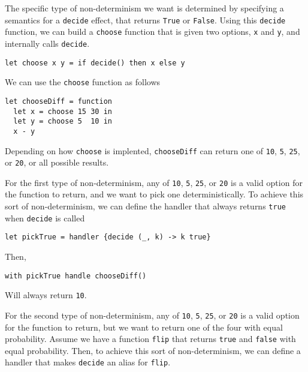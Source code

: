 The specific type of non-determinism we want is determined by specifying a semantics for a \texttt{decide} effect, that returns \texttt{True} or \texttt{False}. Using this \texttt{decide} function, we can build a \texttt{choose} function that is given two options, \texttt{x} and \texttt{y}, and internally calls \texttt{decide}.

\begin{code}
\begin{verbatim}
let choose x y = if decide() then x else y
\end{verbatim}
\end{code}

We can use the \texttt{choose} function as follows

\begin{code}
\begin{verbatim}
let chooseDiff = function
  let x = choose 15 30 in
  let y = choose 5  10 in
  x - y
\end{verbatim}
\end{code}

Depending on how \texttt{choose} is implented, \texttt{chooseDiff} can return one of \texttt{10}, \texttt{5}, \texttt{25}, or \texttt{20}, or all possible results. 

For the first type of non-determinism, any of \texttt{10}, \texttt{5}, \texttt{25}, or \texttt{20} is a valid option for the function to return, and we want to pick one deterministically. To achieve this sort of non-determinism, we can define the handler that always returns \texttt{true} when \texttt{decide} is called

\begin{verbatim}
let pickTrue = handler {decide (_, k) -> k true}
\end{verbatim}
Then, 
\begin{verbatim}
with pickTrue handle chooseDiff()
\end{verbatim}
Will always return \texttt{10}.

For the second type of non-determinism, any of \texttt{10}, \texttt{5}, \texttt{25}, or \texttt{20} is a valid option for the function to return, but we want to return one of the four with equal probability. Assume we have a function \texttt{flip} that returns \texttt{true} and \texttt{false} with equal probability. Then, to achieve this sort of non-determinism, we can define a handler that makes \texttt{decide} an alias for \texttt{flip}. 

